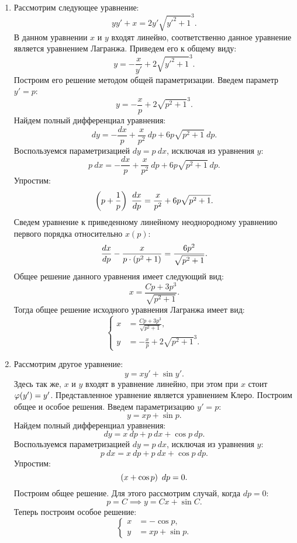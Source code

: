 		\begin{enumerate}
			\item Рассмотрим следующее уравнение:
				\[ yy' + x = 2 y' \sqrt{y'^2 + 1}^3. \]
				В данном уравнении $x$ и $y$ входят линейно, соответственно данное уравнение является уравнением Лагранжа. Приведем его к общему виду:
				\[ y = - \frac{x}{y'} + 2 \sqrt{y'^2 + 1}^3. \]
				Построим его решение методом общей параметризации. Введем параметр $y' = p$:
				\[ y = - \frac{x}{p} + 2 \sqrt{p^2 + 1}^3. \]
				Найдем полный дифференциал уравнения:
				\[ dy = -\frac{dx}{p} + \frac{x}{p^2} ~ dp + 6p \sqrt{p^2 + 1} ~ dp. \]
				Воспользуемся параметризацией $dy = p ~ dx$, исключая из уравнения $y$:
				\[ p ~ dx = - \frac{dx}{p} + \frac{x}{p^2} ~ dp + 6p \sqrt{p^2 + 1} ~ dp. \]
				Упростим:
				\[ \left( p + \frac{1}{p} \right) ~ \dfrac{d x}{d p} = \frac{x}{p^2} + 6p \sqrt{p^2 + 1}. \]
				Сведем уравнение к приведенному линейному неоднородному уравнению первого порядка относительно $x(p)$:
				\[ \dfrac{d x}{d p} - \frac{x}{p \cdot \left( p^2 + 1 \right)} = \frac{6p^2 }{\sqrt{p^2 + 1}}. \]
				Общее решение данного уравнения имеет следующий вид:
				\[ x = \frac{Cp + 3p^3}{\sqrt{p^2 + 1}}. \]
				Тогда общее решение исходного уравнения Лагранжа имеет вид:
				\[ \left\lbrace \begin{split} 
					x &= \frac{Cp + 3p^3}{\sqrt{p^2 + 1}}, \\
					y &= - \frac{x}{p} + 2 \sqrt{p^2 + 1}^3.
				\end{split} \right. \]

			\item Рассмотрим другое уравнение:
				\[ y = xy' + \sin{y'}. \]
				Здесь так же, $x$ и $y$ входят в уравнение линейно, при этом при $x$ стоит $\varphi(y') = y'$. Представленное уравнение является уравнением Клеро. Построим общее и особое решения. Введем параметризацию $y' = p$:
				\[ y = xp + \sin{p}. \]
				Найдем полный дифференциал уравнения:
				\[ dy = x ~ dp + p ~ dx + \cos{p} ~ dp. \]
				Воспользуемся параметризацией $dy = p ~ dx$, исключая из уравнения $y$:
				\[ p ~ dx = x ~ dp + p ~ dx + \cos{p} ~ dp. \]
				Упростим:
				\[ \left( x + \cos{p} \right) ~ dp = 0. \]
				Построим общее решение. Для этого рассмотрим случай, когда $dp = 0$:
				\[ p = C \implies y = Cx + \sin{C}. \]
				Теперь построим особое решение:
				\[ \left\lbrace \begin{split} x &= - \cos{p}, \\ y &= xp + \sin{p}. \end{split} \right. \]

		\end{enumerate}
